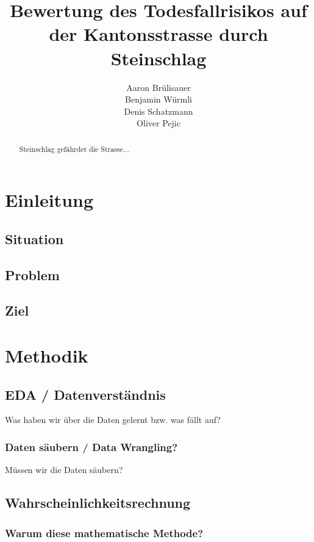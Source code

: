 \documentclass[a4paper,10pt]{report}
\title{Bewertung des Todesfallrisikos auf der Kantonsstrasse durch Steinschlag}
\author{Aaron Brülisauer\\Benjamin Würmli\\Denis Schatzmann\\Oliver Pejic}
\begin{document}
    \maketitle

    \begin{abstract}
        Steinschlag gefährdet die Strasse...
    \end{abstract}

    \tableofcontents


    \chapter{Einleitung}


    \section{Situation}


    \section{Problem}


    \section{Ziel}

    \chapter{Methodik}


    \section{EDA / Datenverständnis}
    Was haben wir über die Daten gelernt bzw. was fällt auf?

    \subsection{Daten säubern / Data Wrangling?}
    Müssen wir die Daten säubern?


    \section{Wahrscheinlichkeitsrechnung}

    \subsection{Warum diese mathematische Methode?}
\end{document}

